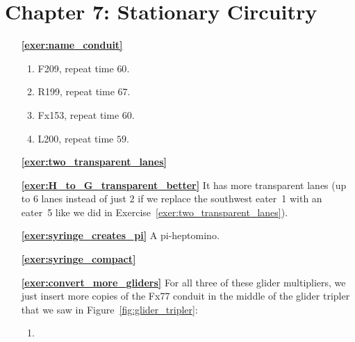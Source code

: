 \section*{Chapter 7: Stationary Circuitry}
\renewcommand{\chapterfolder}{stationary_circuitry/}

\begin{multicols}{2}
	\begin{itemize}[leftmargin=0em]
		\item[\bf\color{ocre}\sffamily\ref{exer:name_conduit}] \begin{enumerate}[leftmargin=1.5em,label=\bf\color{ocre}(\alph*)]
			\item F209, repeat time $60$.
			
			\item R199, repeat time $67$.
			
			\item Fx153, repeat time $60$.
			
			\item L200, repeat time $59$.\\
		\end{enumerate}
	

		\item[\bf\color{ocre}\sffamily\ref{exer:two_transparent_lanes}]  \\
		
		
		\item[\bf\color{ocre}\sffamily\ref{exer:H_to_G_transparent_better}] It has more transparent lanes (up to $6$ lanes instead of just $2$ if we replace the southwest eater~1 with an eater~5 like we did in Exercise~\ref{exer:two_transparent_lanes}).\\
			
	
		\item[\bf\color{ocre}\sffamily\ref{exer:syringe_creates_pi}] A pi-heptomino. \\
		
		
		\item[\bf\color{ocre}\sffamily\ref{exer:syringe_compact}]  \\
		
		
		\item[\bf\color{ocre}\sffamily\ref{exer:convert_more_gliders}] For all three of these glider multipliers, we just insert more copies of the Fx77 conduit in the middle of the glider tripler that we saw in Figure~\ref{fig:glider_tripler}:
		\begin{enumerate}[leftmargin=1.5em,label=\bf\color{ocre}(\alph*)]
			\item {} \\
			

\end{enumerate}
\end{itemize}
\end{multicols}
